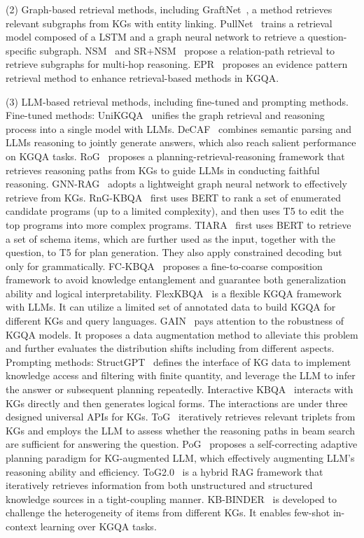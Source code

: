 \documentclass[lettersize,journal]{IEEEtran}
\begin{document}
(2) Graph-based retrieval methods, including GraftNet~\cite{sun2018open}, a method retrieves relevant subgraphs from KGs with entity linking. PullNet~\cite{sun2019pullnet} trains a retrieval model composed of a LSTM and a graph neural network to retrieve a question-specific subgraph. NSM~\cite{he2021improving} and SR+NSM~\cite{zhang2022subgraph} propose a relation-path retrieval to retrieve subgraphs for multi-hop reasoning. EPR~\cite{ding2024enhancing} proposes an evidence pattern retrieval method to enhance retrieval-based methods in KGQA. 


(3) LLM-based retrieval methods, including fine-tuned and prompting methods. Fine-tuned methods: UniKGQA~\cite{jiang2022unikgqa} unifies the graph retrieval and reasoning process into a single model with LLMs. DeCAF~\cite{yu2022decaf} combines semantic parsing and LLMs reasoning to jointly generate answers, which also reach salient performance on KGQA tasks. RoG~\cite{luo2023reasoning} proposes a planning-retrieval-reasoning framework that retrieves reasoning paths from KGs to guide LLMs in conducting faithful reasoning. GNN-RAG~\cite{mavromatis2024gnn} adopts a lightweight graph neural network to effectively retrieve from KGs. RnG-KBQA~\cite{ye2021rng} first uses BERT to rank a set of enumerated candidate programs (up to a limited complexity), and then uses T5 to edit the top programs into more complex programs. TIARA~\cite{shu2022tiara} first uses BERT to retrieve a set of schema items, which are further used as the input, together with the question, to T5 for plan generation. They also apply constrained decoding but only for grammatically. FC-KBQA~\cite{zhang2023fc} proposes a fine-to-coarse composition framework to avoid knowledge entanglement and guarantee both generalization ability and logical interpretability. FlexKBQA~\cite{li2024flexkbqa} is a flexible KGQA framework with LLMs. It can utilize a limited set of annotated data to build KGQA for different KGs and query languages. GAIN~\cite{shu2024distribution} pays attention to the robustness of KGQA models. It proposes a data augmentation method to alleviate this problem and further evaluates the distribution shifts including from different aspects. Prompting methods: StructGPT~\cite{jiang2023structgpt} defines the interface of KG data to implement knowledge access and filtering with finite quantity, and leverage the LLM to infer the answer or subsequent planning repeatedly. Interactive KBQA~\cite{xiong2024interactive} interacts with KGs directly and then generates logical forms. The interactions are under three designed universal APIs for KGs. ToG~\cite{sun2023think} iteratively retrieves relevant triplets from KGs and employs the LLM to assess whether the reasoning paths in beam search are sufficient for answering the question. PoG~\cite{chen2024plan} proposes a self-correcting adaptive planning paradigm for KG-augmented LLM, which effectively augmenting LLM’s reasoning ability and efficiency. ToG2.0~\cite{ma2024think} is a hybrid RAG framework that iteratively retrieves information from both unstructured and structured knowledge sources in a tight-coupling manner. KB-BINDER~\cite{li2023few} is developed to challenge the heterogeneity of items from different KGs. It enables few-shot in-context learning over KGQA tasks.
\end{document}
